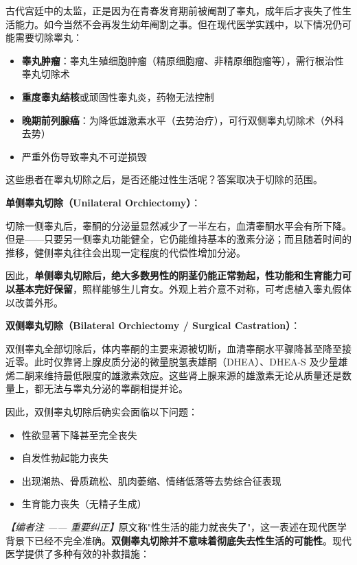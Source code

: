 \begin{enumerate}
\vspace{0.5em}
古代宫廷中的太监，正是因为在青春发育期前被阉割了睾丸，成年后才丧失了性生活能力。如今当然不会再发生幼年阉割之事。但在现代医学实践中，以下情况仍可能需要切除睾丸：
\begin{itemize}
	\item \textbf{睾丸肿瘤}：睾丸生殖细胞肿瘤（精原细胞瘤、非精原细胞瘤等），需行根治性睾丸切除术
	\item \textbf{重度睾丸结核}或顽固性睾丸炎，药物无法控制
	\item \textbf{晚期前列腺癌}：为降低雄激素水平（去势治疗），可行双侧睾丸切除术（外科去势）
	\item 严重外伤导致睾丸不可逆损毁
\end{itemize}
这些患者在睾丸切除之后，是否还能过性生活呢？答案取决于切除的范围。

\vspace{0.5em}
\noindent\textbf{单侧睾丸切除（Unilateral Orchiectomy）}：

切除一侧睾丸后，睾酮的分泌量显然减少了一半左右，血清睾酮水平会有所下降。但是——只要另一侧睾丸功能健全，它仍能维持基本的激素分泌；而且随着时间的推移，健侧睾丸往往会出现一定程度的代偿性增加分泌。

因此，\textbf{单侧睾丸切除后，绝大多数男性的阴茎仍能正常勃起，性功能和生育能力可以基本完好保留}，照样能够生儿育女。外观上若介意不对称，可考虑植入睾丸假体以改善外形。

\vspace{0.5em}
\noindent\textbf{双侧睾丸切除（Bilateral Orchiectomy / Surgical Castration）}：

双侧睾丸全部切除后，体内睾酮的主要来源被切断，血清睾酮水平骤降甚至降至接近零。此时仅靠肾上腺皮质分泌的微量脱氢表雄酮（DHEA）、DHEA-S 及少量雄烯二酮来维持最低限度的雄激素效应。这些肾上腺来源的雄激素无论从质量还是数量上，都无法与睾丸分泌的睾酮相提并论。

因此，双侧睾丸切除后确实会面临以下问题：
\begin{itemize}
	\item 性欲显著下降甚至完全丧失
	\item 自发性勃起能力丧失
	\item 出现潮热、骨质疏松、肌肉萎缩、情绪低落等去势综合征表现
	\item 生育能力丧失（无精子生成）
\end{itemize}

\noindent\textit{【编者注 —— 重要纠正】}原文称"性生活的能力就丧失了"，这一表述在现代医学背景下已经不完全准确。\textbf{双侧睾丸切除并不意味着彻底失去性生活的可能性}。现代医学提供了多种有效的补救措施：


\end{enumerate}
